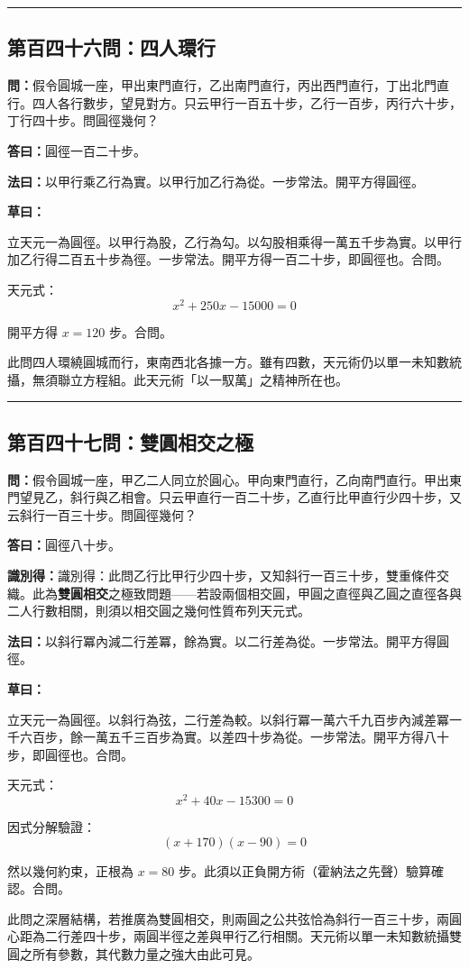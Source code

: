 \documentclass[11pt,a4paper]{article}
\newcommand{\longline}{\noindent\rule{\textwidth}{0.4pt}}
\newcommand{\wen}[1]{\par\noindent\textbf{\textcolor{probcolor}{問：}}{#1}\par}
\newcommand{\da}[1]{\par\noindent\textbf{\textcolor{anscolor}{答曰：}}{#1}\par}
\newcommand{\fayue}[1]{\par\noindent\textbf{\textcolor{methodcolor}{法曰：}}{#1}\par}
\newcommand{\caoyue}[1]{\par\noindent\textbf{草曰：}{#1}\par}
\newcommand{\zhi}[1]{\par\noindent\textbf{識別得：}{#1}\par}
\begin{document}
\vspace{0.5cm}
\longline

\subsection*{第百四十六問：四人環行}
\wen{假令圓城一座，甲出東門直行，乙出南門直行，丙出西門直行，丁出北門直行。四人各行數步，望見對方。只云甲行一百五十步，乙行一百步，丙行六十步，丁行四十步。問圓徑幾何？}

\da{圓徑一百二十步。}

\fayue{以甲行乘乙行為實。以甲行加乙行為從。一步常法。開平方得圓徑。}

\caoyue{
立天元一為圓徑。以甲行為股，乙行為勾。以勾股相乘得一萬五千步為實。以甲行加乙行得二百五十步為徑。一步常法。開平方得一百二十步，即圓徑也。合問。

天元式：
$$x^2 + 250x - 15000 = 0$$

開平方得 $x = 120$ 步。合問。

此問四人環繞圓城而行，東南西北各據一方。雖有四數，天元術仍以單一未知數統攝，無須聯立方程組。此天元術「以一馭萬」之精神所在也。
}

\vspace{0.5cm}
\longline

\subsection*{第百四十七問：雙圓相交之極}
\wen{假令圓城一座，甲乙二人同立於圓心。甲向東門直行，乙向南門直行。甲出東門望見乙，斜行與乙相會。只云甲直行一百二十步，乙直行比甲直行少四十步，又云斜行一百三十步。問圓徑幾何？}

\da{圓徑八十步。}

\zhi{識別得：此問乙行比甲行少四十步，又知斜行一百三十步，雙重條件交織。此為\textbf{雙圓相交}之極致問題——若設兩個相交圓，甲圓之直徑與乙圓之直徑各與二人行數相關，則須以相交圓之幾何性質布列天元式。}

\fayue{以斜行冪內減二行差冪，餘為實。以二行差為從。一步常法。開平方得圓徑。}

\caoyue{
立天元一為圓徑。以斜行為弦，二行差為較。以斜行冪一萬六千九百步內減差冪一千六百步，餘一萬五千三百步為實。以差四十步為從。一步常法。開平方得八十步，即圓徑也。合問。

天元式：
$$x^2 + 40x - 15300 = 0$$

因式分解驗證：
$$(x + 170)(x - 90) = 0$$

然以幾何約束，正根為 $x = 80$ 步。此須以正負開方術（霍納法之先聲）驗算確認。合問。

此問之深層結構，若推廣為雙圓相交，則兩圓之公共弦恰為斜行一百三十步，兩圓心距為二行差四十步，兩圓半徑之差與甲行乙行相關。天元術以單一未知數統攝雙圓之所有參數，其代數力量之強大由此可見。
}
\end{document}
